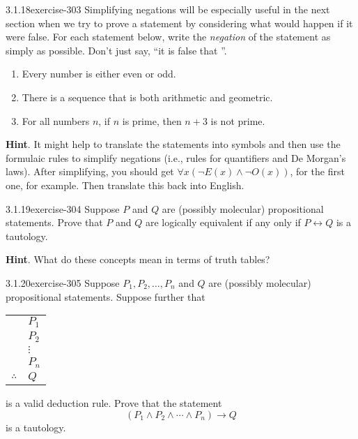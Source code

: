 \documentclass[twoside,11pt,]{book}
\numberwithin{equation}{chapter}
\newcommand{\hrulethin}  {\noalign{\hrule height 0.04em}}
\renewcommand{\iff}{\leftrightarrow}
\newcommand{\imp}{\rightarrow}
\begin{document}
\begin{divisionsolution}{3.1.18}{}{exercise-303}%
\hypertarget{p-4001}{}%
Simplifying negations will be especially useful in the next section when we try to prove a statement by considering what would happen if it were false.  For each statement below, write the \emph{negation} of the statement as simply as possible.  Don't just say, ``it is false that \textellipsis{}''.\leavevmode%
\begin{enumerate}[label=(\alph*)]
\item\hypertarget{li-2093}{}\hypertarget{p-4002}{}%
Every number is either even or odd.%
\item\hypertarget{li-2094}{}\hypertarget{p-4003}{}%
There is a sequence that is both arithmetic and geometric.%
\item\hypertarget{li-2095}{}\hypertarget{p-4004}{}%
For all numbers \(n\), if \(n\) is prime, then \(n+3\) is not prime.%
\end{enumerate}
%
\par\smallskip%
\noindent\textbf{Hint}.\quad%
\hypertarget{p-4005}{}%
It might help to translate the statements into symbols and then use the formulaic rules to simplify negations (i.e., rules for quantifiers and De Morgan's laws).  After simplifying, you should get \(\forall x(\neg E(x) \wedge \neg O(x))\), for the first one, for example.  Then translate this back into English.%
\end{divisionsolution}%
\begin{divisionsolution}{3.1.19}{}{exercise-304}%
\hypertarget{p-4006}{}%
Suppose \(P\) and \(Q\) are (possibly molecular) propositional statements. Prove that \(P\) and \(Q\) are logically equivalent if any only if \(P \iff Q\) is a tautology.%
\par\smallskip%
\noindent\textbf{Hint}.\quad%
\hypertarget{p-4007}{}%
What do these concepts mean in terms of truth tables?%
\end{divisionsolution}%
\begin{divisionsolution}{3.1.20}{}{exercise-305}%
\hypertarget{p-4008}{}%
Suppose \(P_1, P_2, \ldots, P_n\) and \(Q\) are (possibly molecular) propositional statements. Suppose further that%
\begin{sidebyside}{1}{0}{0}{0}%
\begin{sbspanel}{1}%
{\centering%
\begin{tabular}{ll}
&\(P_1\)\tabularnewline[0pt]
&\(P_2\)\tabularnewline[0pt]
&\(\vdots\)\tabularnewline[0pt]
&\(P_n\)\tabularnewline\hrulethin
\(\therefore\)&\(Q\)
\end{tabular}
\par}
\end{sbspanel}%
\end{sidebyside}%
\par
\hypertarget{p-4009}{}%
is a valid deduction rule. Prove that the statement%
\begin{equation*}
(P_1 \wedge P_2 \wedge \cdots \wedge P_n) \imp Q
\end{equation*}
is a tautology.%
\end{divisionsolution}%
\end{document}
